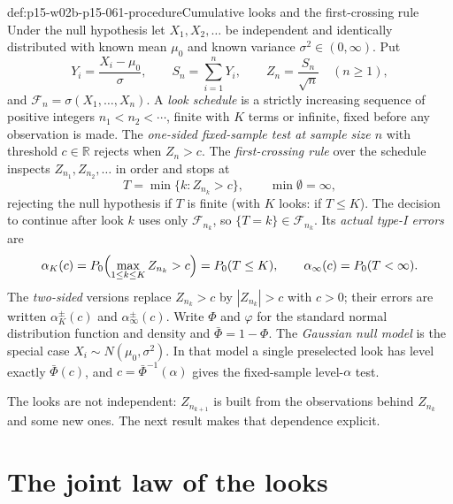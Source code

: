 \begin{hbdefinition}{def:p15-w02b-p15-061-procedure}{Cumulative looks and the first-crossing rule}
Under the null hypothesis let \(X_1,X_2,\ldots\) be independent and
identically distributed with known mean \(\mu_0\) and known variance
\(\sigma^2\in(0,\infty)\). Put
\[
 Y_i=\frac{X_i-\mu_0}{\sigma},\qquad
 S_n=\sum_{i=1}^nY_i,\qquad
 Z_n=\frac{S_n}{\sqrt n}\quad(n\geq1),
\]
and \(\mathcal F_n=\sigma(X_1,\ldots,X_n)\). A \emph{look schedule}
is a strictly increasing sequence of positive integers
\(n_1<n_2<\cdots\), finite with \(K\) terms or infinite, fixed before
any observation is made. The \emph{one-sided fixed-sample test at sample
size \(n\)} with threshold \(c\in\mathbb R\) rejects when \(Z_n>c\).
The \emph{first-crossing rule} over the schedule inspects
\(Z_{n_1},Z_{n_2},\ldots\) in order and stops at
\[
 T=\min\{k:Z_{n_k}>c\},\qquad \min\emptyset=\infty,
\]
rejecting the null hypothesis if \(T\) is finite (with \(K\) looks: if
\(T\leq K\)). The decision to continue after look \(k\) uses only
\(\mathcal F_{n_k}\), so \(\{T=k\}\in\mathcal F_{n_k}\).
Its \emph{actual type-I errors} are
\[
 \alpha_K(c)=P_0\Bigl(\max_{1\leq k\leq K}Z_{n_k}>c\Bigr)=P_0(T\leq K),
 \qquad
 \alpha_\infty(c)=P_0(T<\infty).
\]
The \emph{two-sided} versions replace \(Z_{n_k}>c\) by
\(|Z_{n_k}|>c\) with \(c>0\); their errors are written
\(\alpha^{\pm}_K(c)\) and \(\alpha^{\pm}_\infty(c)\).
Write \(\Phi\) and \(\varphi\) for the standard normal distribution
function and density and \(\bar\Phi=1-\Phi\).
The \emph{Gaussian null model} is the special case
\(X_i\sim N(\mu_0,\sigma^2)\). In that model a single preselected look
has level exactly \(\bar\Phi(c)\), and \(c=\bar\Phi^{-1}(\alpha)\) gives
the fixed-sample level-\(\alpha\) test.
\end{hbdefinition}

The looks are not independent: \(Z_{n_{k+1}}\) is built from the
observations behind \(Z_{n_k}\) and some new ones. The next result makes
that dependence explicit.

\section{The joint law of the looks}
\label{sec:p15-w02b-p15-061-dependence}

